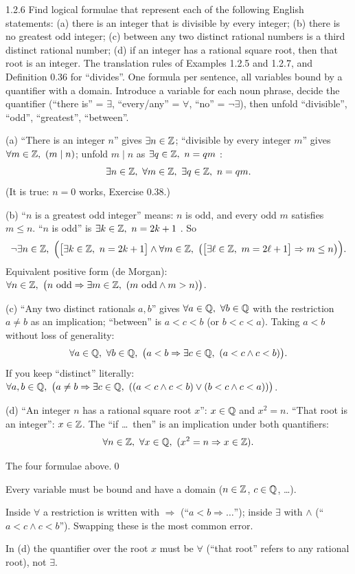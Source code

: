 \begin{bookex}[essential]{1.2.6}
Find logical formulae that represent each of the following English statements: (a) there is an integer that is divisible by every integer; (b) there is no greatest odd integer; (c) between any two distinct rational numbers is a third distinct rational number; (d) if an integer has a rational square root, then that root is an integer.
\solution
\given The translation rules of Examples 1.2.5 and 1.2.7, and Definition 0.36 for ``divides''.
\goal One formula per sentence, all variables bound by a quantifier with a domain.
\plan Introduce a variable for each noun phrase, decide the quantifier (``there is'' = $\exists$, ``every/any'' = $\forall$, ``no'' = $\neg\exists$), then unfold ``divisible'', ``odd'', ``greatest'', ``between''.
\begin{steps}
\item (a) ``There is an integer $n$'' gives $\exists n\in\mathbb{Z}$; ``divisible by every integer $m$'' gives $\forall m\in\mathbb{Z},\ (m\mid n)$; unfold $m\mid n$ as $\exists q\in\mathbb{Z},\ n=qm$ :
\[
\exists n\in\mathbb{Z},\ \forall m\in\mathbb{Z},\ \exists q\in\mathbb{Z},\ n=qm .
\]
(It is true: $n=0$ works, Exercise 0.38.)
\item (b) ``$n$ is a greatest odd integer'' means: $n$ is odd, and every odd $m$ satisfies $m\le n$. ``$n$ is odd'' is $\exists k\in\mathbb{Z},\ n=2k+1$ . So
\[
\neg\exists n\in\Z,\ \Big(\big[\exists k\in\Z,\ n=2k+1\big]\wedge\forall m\in\Z,\ \big(\big[\exists\ell\in\Z,\ m=2\ell+1\big]\Rightarrow m\le n\big)\Big).
\]
Equivalent positive form (de Morgan): $\forall n\in\Z,\ \big(n\text{ odd}\Rightarrow\exists m\in\Z,\ (m\text{ odd}\wedge m>n)\big)$.
\item (c) ``Any two distinct rationals $a,b$'' gives $\forall a\in\mathbb{Q},\ \forall b\in\mathbb{Q}$ with the restriction $a\ne b$ as an implication; ``between'' is $a<c<b$ (or $b<c<a$). Taking $a<b$ without loss of generality:
\[
\forall a\in\Q,\ \forall b\in\Q,\ \big(a<b\Rightarrow\exists c\in\Q,\ (a<c\wedge c<b)\big).
\]
If you keep ``distinct'' literally: $\forall a,b\in\mathbb{Q},\ \big(a\ne b\Rightarrow\exists c\in\mathbb{Q},\ ((a<c\wedge c<b)\vee(b<c\wedge c<a))\big)$.
\item (d) ``An integer $n$ has a rational square root $x$'': $x\in\mathbb{Q}$ and $x^2=n$. ``That root is an integer'': $x\in\mathbb{Z}$. The ``if \dots\ then'' is an implication under both quantifiers:
\[
\forall n\in\Z,\ \forall x\in\Q,\ (x^2=n\Rightarrow x\in\Z).
\]
\end{steps}
\conclusion The four formulae above.\qed
\begin{compare}
\item Every variable must be bound and have a domain ($n\in\mathbb{Z}$, $c\in\mathbb{Q}$, \dots).
\item Inside $\forall$ a restriction is written with $\Rightarrow$ (``$a<b\Rightarrow\dots$''); inside $\exists$ with $\wedge$ (``$a<c\wedge c<b$''). Swapping these is the most common error.
\item In (d) the quantifier over the root $x$ must be $\forall$ (``that root'' refers to any rational root), not $\exists$.
\end{compare}
\end{bookex}

